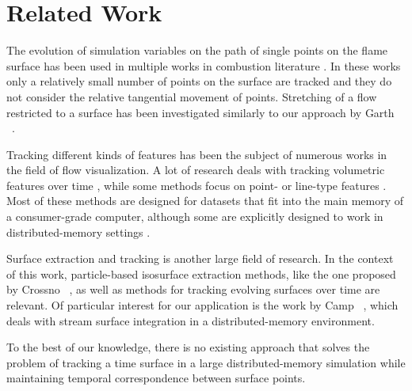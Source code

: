 %
\section{Related Work} %
\label{sec:fst_background_and_related_work}
%
The evolution of simulation variables on the path of single points on the flame
surface has been used in multiple works in combustion literature
\cite{Yeung1990,Sripakagorn2004,Scholtissek2017}.
%
In these works only a relatively small number of points on the surface are
tracked and they do not consider the relative tangential movement of points.
%
Stretching of a flow restricted to a surface has been investigated similarly to
our approach by Garth \etal{}~\cite{Garth2008}.
%

%
Tracking different kinds of features has been the subject of numerous works in
the field of flow visualization.
%
A lot of research deals with tracking volumetric features over time
\cite{Silver1997,Sauer2014,Clyne2013,Mascarenhas2009,Duque2012,Muelder2009},
while some methods focus on point-\cite{Garth2004,Theisel2003a} or line-type
features \cite{Bremer2010}.
%
Most of these methods are designed for datasets that fit into the main memory of
a consumer-grade computer, although some are explicitly designed to work in
distributed-memory settings \cite{Wang2013}.
%

%
Surface extraction and tracking is another large field of research.
%
In the context of this work, particle-based isosurface extraction methods, like
the one proposed by Crossno \etal{}~\cite{Crossno1997}, as well as methods for
tracking evolving surfaces over time \cite{Krishnan2009,Buerger2009,Berres2015}
are relevant.
%
Of particular interest for our application is the work by Camp
\etal{}~\cite{Camp2012}, which deals with stream surface integration in a
distributed-memory environment.
%

%
To the best of our knowledge, there is no existing approach that solves the
problem of tracking a time surface in a large distributed-memory simulation
while maintaining temporal correspondence between surface points.
%
